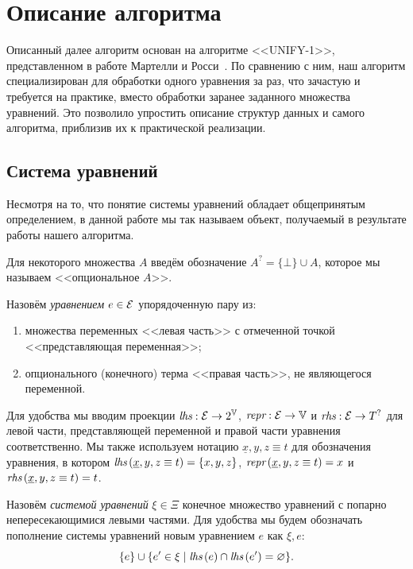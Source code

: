 \section{Описание алгоритма}

Описанный далее алгоритм основан на алгоритме <<UNIFY-1>>, представленном в работе Мартелли и Росси~\cite{martelli1984efficient}. По сравнению с ним, наш алгоритм специализирован для обработки одного уравнения за раз, что зачастую и требуется на практике, вместо обработки заранее заданного множества уравнений. Это позволило упростить описание структур данных и самого алгоритма, приблизив их к практической реализации.

\subsection{Система уравнений}

Несмотря на то, что понятие системы уравнений обладает общепринятым определением, в данной работе мы так называем объект, получаемый в результате работы нашего алгоритма.

Для некоторого множества $A$ введём обозначение $A^? = \{ \bot \} \cup A$, которое мы называем <<опциональное $A$>>.

\begin{definition}[Уравнение]
    Назовём \textit{уравнением} $e \in \mathcal{E}$ упорядоченную пару из:
    \begin{enumerate}
        \item множества переменных <<левая часть>> с отмеченной точкой <<представляющая переменная>>;
        \item опционального (конечного) терма <<правая часть>>, не являющегося переменной.
    \end{enumerate}

    Для удобства мы вводим проекции $\textit{lhs} : \mathcal{E} \rightarrow 2^{\mathbb{V}}$, $\textit{repr} : \mathcal{E} \rightarrow \mathbb{V}$ и $\textit{rhs} : \mathcal{E} \rightarrow T^?$ для левой части, представляющей переменной и правой части уравнения соответственно. Мы также используем нотацию $\underline{x}, y, z \equiv t$ для обозначения уравнения, в котором $\textit{lhs}\,(\underline{x}, y, z \equiv t) = \{ x, y, z \}$, $\textit{repr}\,(\underline{x}, y, z \equiv t) = x$ и $\textit{rhs}\,(\underline{x}, y, z \equiv t) = t$.
\end{definition}

\begin{definition}
    Назовём \textit{системой уравнений} $\xi \in \Xi$ конечное множество уравнений с попарно непересекающимися левыми частями. Для удобства мы будем обозначать пополнение системы уравнений новым уравнением $e$ как $\xi, e$:
    \[\{ e \} \cup \{ e' \in \xi \mid \textit{lhs}\,(e) \cap \textit{lhs}\,(e') = \varnothing \}.\]
\end{definition}

